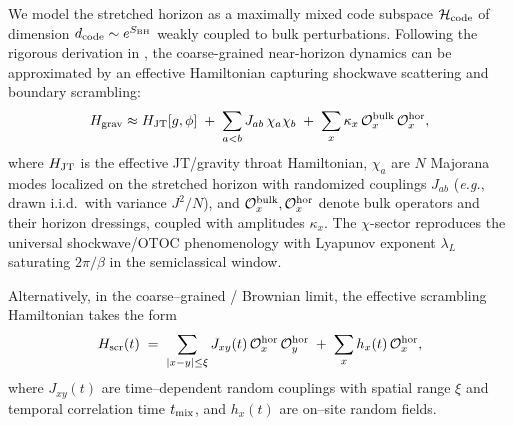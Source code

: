 \documentclass[aps,prd,preprint,onecolumn,superscriptaddress,nofootinbib,longbibliography,floatfix,11pt,showpacs,showkeys]{revtex4-2}
\newcommand{\eg}{\textit{e.g.}\xspace}
\theoremstyle{plain}
\theoremstyle{definition}
\theoremstyle{remark}
\begin{document}
We model the stretched horizon as a maximally mixed code subspace $\mathcal{H}_{\rm code}$ of dimension $d_{\rm code}\sim e^{S_{\rm BH}}$ weakly coupled to bulk perturbations. Following the rigorous derivation in , the coarse-grained near-horizon dynamics can be approximated by an effective Hamiltonian capturing shockwave scattering and boundary scrambling:
\begin{equation}
H_{\rm grav}\approx H_{\rm JT}[g,\phi]\;+\;\sum_{a<b} J_{ab}\,\chi_a\chi_b\;+\;\sum_{x}\kappa_x\,\mathcal{O}^{\rm bulk}_x\,\mathcal{O}^{\rm hor}_x,
\label{eq:Hgrav}
\end{equation}
where $H_{\rm JT}$ is the effective JT/gravity throat Hamiltonian, $\chi_a$ are $N$ Majorana modes localized on the stretched horizon with randomized couplings $J_{ab}$ (\eg, drawn i.i.d.\ with variance $J^2/N$), and $\mathcal{O}^{\rm bulk}_x, \mathcal{O}^{\rm hor}_x$ denote bulk operators and their horizon dressings, coupled with amplitudes $\kappa_x$. The $\chi$-sector reproduces the universal shockwave/OTOC phenomenology with Lyapunov exponent $\lambda_L$ saturating $2\pi/\beta$ in the semiclassical window.

Alternatively, in the coarse--grained / Brownian limit, the effective scrambling Hamiltonian takes the form
\begin{equation}
H_{\rm scr}(t)\;=\;\sum_{|x-y|\le \xi} J_{xy}(t)\,\mathcal{O}^{\rm hor}_x\,\mathcal{O}^{\rm hor}_y\;+\;\sum_x h_x(t)\,\mathcal{O}^{\rm hor}_x,
\label{eq:scrambling-ham}
\end{equation}
where $J_{xy}(t)$ are time--dependent random couplings with spatial range $\xi$ and temporal correlation time $t_{\rm mix}$, and $h_x(t)$ are on--site random fields.
 
\end{document}

